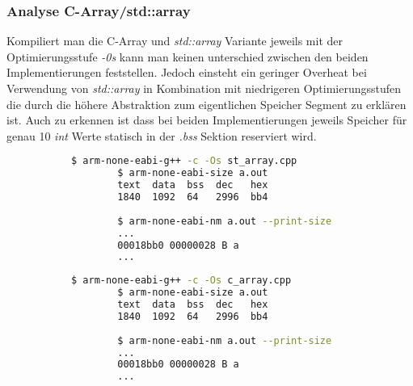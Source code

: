 \documentclass[MES,Master,ngerman]{twbook}%
\begin{document}
\begin{figure}[!htb]
	\begin{subfigure}[b]{0.5\textwidth}
		
		\label{fig:7}
	\end{subfigure}
	\begin{subfigure}[b]{0.5\textwidth}
		
		\label{fig:8}
	\end{subfigure}
\end{figure}

\subsubsection{Analyse C-Array/std::array}
Kompiliert man die C-Array und \textit{std::array} Variante jeweils mit der Optimierungsstufe \textit{-0s} kann man keinen unterschied zwischen den beiden Implementierungen feststellen. Jedoch einsteht ein geringer Overheat bei Verwendung von \textit{std::array} in Kombination mit niedrigeren Optimierungsstufen die durch die höhere Abstraktion zum eigentlichen Speicher Segment zu erklären ist. Auch zu erkennen ist dass bei beiden Implementierungen jeweils Speicher für genau 10 \textit{int} Werte statisch in der \textit{.bss} Sektion reserviert wird.


\begin{figure}[!htb]
	\begin{subfigure}[b]{0.5\textwidth}
		\begin{lstlisting}[gobble=6, title={std::array}, language=bash, numbers=none]
		$ arm-none-eabi-g++ -c -Os st_array.cpp
		$ arm-none-eabi-size a.out
		text  data  bss  dec   hex
		1840  1092  64   2996  bb4
		
		$ arm-none-eabi-nm a.out --print-size
		...
		00018bb0 00000028 B a
		...
		\end{lstlisting}
	\end{subfigure}
	\begin{subfigure}[b]{0.5\textwidth}
		\begin{lstlisting}[gobble=6, title={C-Array}, language=bash, numbers=none]
		$ arm-none-eabi-g++ -c -Os c_array.cpp
		$ arm-none-eabi-size a.out
		text  data  bss  dec   hex
		1840  1092  64   2996  bb4
		
		$ arm-none-eabi-nm a.out --print-size
		...
		00018bb0 00000028 B a
		...
		\end{lstlisting}
	\end{subfigure}
\end{figure}
\end{document}
